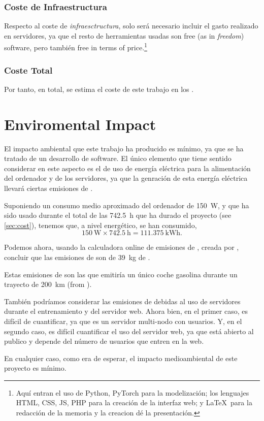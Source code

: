 \subsubsection{Coste de Infraestructura}

Respecto al coste de \emph{infraesctructura}, solo será necesario incluir el
gasto realizado en servidores, ya que el resto de herramientas usadas son free
(as in \emph{freedom}) software, pero también free in terms of
price.\footnote{Aquí entran el uso de Python, PyTorch para la modelización; los
  lenguajes HTML, CSS, JS, PHP para la creación de la interfaz web; y \LaTeX\
  para la redacción de la memoria y la creacion dé la presentación.}

\subsubsection{Coste Total}

Por tanto, en total, se estima el coste de este trabajo en los .



\section{Enviromental Impact}

El impacto ambiental que este trabajo ha producido es mínimo, ya que se ha
tratado de un desarrollo de software. El único elemento que tiene sentido
considerar en este aspecto es el de uso de energía eléctrica para la
alimentación del ordenador y de los servidores, ya que la genración de esta
energía eléctrica llevará ciertas emisiones de \ch{CO2}.

Suponiendo un consumo medio aproximado del ordenador de \SI{150}{\watt}, y que
ha sido usado durante el total de las \SI{742.5}{\hour} que ha durado el
proyecto (see \vref{sec:cost}), tenemos que, a nivel energético, se han
consumido,
\begin{equation}
  \SI{150}{\watt} \times \SI{742.5}{\hour} = \SI{111.375}{\kWh}.
\end{equation}

Podemos ahora, usando la calculadora online de emisiones de , creada
por \myCite{aragon21:emiss_calcul}, concluir que las emisiones de \ch{CO2} son
de \SI{39}{\kg} de \ch{CO2}.

\begin{exampleBox}
  Estas emisiones de  son las que emitiría un único coche gasolina
  durante un trayecto de \SI{200}{\km} (from \cite{aragon21:emiss_calcul}).
\end{exampleBox}

También podríamos considerar las emisiones de  debidas al uso de
servidores durante el entrenamiento y del servidor web. Ahora bien, en el
primer caso, es difícil de cuantificar, ya que es un servidor multi-nodo con
usuarios. Y, en el segundo caso, es difícil cuantificar el uso del servidor
web, ya que está abierto al publico y depende del número de usuarios que entren
en la web.

En cualquier caso, como era de esperar, el impacto medioambiental de este
proyecto es mínimo.